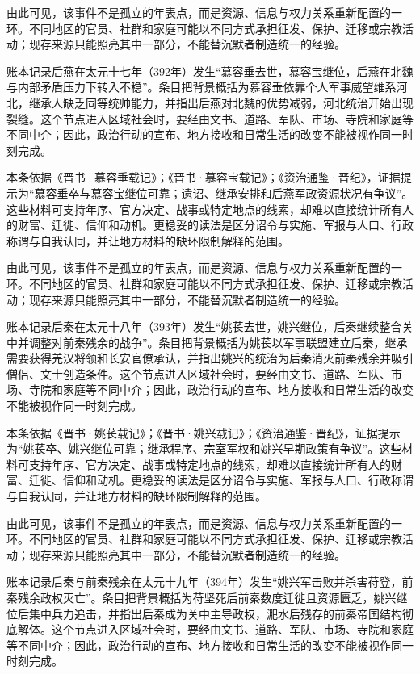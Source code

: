 由此可见，该事件不是孤立的年表点，而是资源、信息与权力关系重新配置的一环。不同地区的官员、社群和家庭可能以不同方式承担征发、保护、迁移或宗教活动；现存来源只能照亮其中一部分，不能替沉默者制造统一的经验。

账本记录后燕在太元十七年（392年）发生“慕容垂去世，慕容宝继位，后燕在北魏与内部矛盾压力下转入不稳”。条目把背景概括为慕容垂依靠个人军事威望维系河北，继承人缺乏同等统帅能力，并指出后燕对北魏的优势减弱，河北统治开始出现裂缝。这个节点进入区域社会时，要经由文书、道路、军队、市场、寺院和家庭等不同中介；因此，政治行动的宣布、地方接收和日常生活的改变不能被视作同一时刻完成。

本条依据《晋书·慕容垂载记》；《晋书·慕容宝载记》；《资治通鉴·晋纪》，证据提示为“慕容垂卒与慕容宝继位可靠；遗诏、继承安排和后燕军政资源状况有争议”。这些材料可支持年序、官方决定、战事或特定地点的线索，却难以直接统计所有人的财富、迁徙、信仰和动机。更稳妥的读法是区分诏令与实施、军报与人口、行政称谓与自我认同，并让地方材料的缺环限制解释的范围。

由此可见，该事件不是孤立的年表点，而是资源、信息与权力关系重新配置的一环。不同地区的官员、社群和家庭可能以不同方式承担征发、保护、迁移或宗教活动；现存来源只能照亮其中一部分，不能替沉默者制造统一的经验。

账本记录后秦在太元十八年（393年）发生“姚苌去世，姚兴继位，后秦继续整合关中并调整对前秦残余的战争”。条目把背景概括为姚苌以军事联盟建立后秦，继承需要获得羌汉将领和长安官僚承认，并指出姚兴的统治为后秦消灭前秦残余并吸引僧侣、文士创造条件。这个节点进入区域社会时，要经由文书、道路、军队、市场、寺院和家庭等不同中介；因此，政治行动的宣布、地方接收和日常生活的改变不能被视作同一时刻完成。

本条依据《晋书·姚苌载记》；《晋书·姚兴载记》；《资治通鉴·晋纪》，证据提示为“姚苌卒、姚兴继位可靠；继承程序、宗室军权和姚兴早期政策有争议”。这些材料可支持年序、官方决定、战事或特定地点的线索，却难以直接统计所有人的财富、迁徙、信仰和动机。更稳妥的读法是区分诏令与实施、军报与人口、行政称谓与自我认同，并让地方材料的缺环限制解释的范围。

由此可见，该事件不是孤立的年表点，而是资源、信息与权力关系重新配置的一环。不同地区的官员、社群和家庭可能以不同方式承担征发、保护、迁移或宗教活动；现存来源只能照亮其中一部分，不能替沉默者制造统一的经验。

账本记录后秦与前秦残余在太元十九年（394年）发生“姚兴军击败并杀害苻登，前秦残余政权灭亡”。条目把背景概括为苻坚死后前秦数度迁徙且资源匮乏，姚兴继位后集中兵力追击，并指出后秦成为关中主导政权，淝水后残存的前秦帝国结构彻底解体。这个节点进入区域社会时，要经由文书、道路、军队、市场、寺院和家庭等不同中介；因此，政治行动的宣布、地方接收和日常生活的改变不能被视作同一时刻完成。

